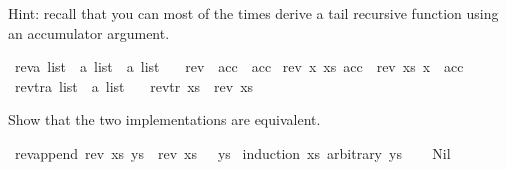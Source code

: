 \begin{isabellebody}
\begin{isamarkuptext}
  Hint: recall that you can most of the times derive a tail recursive function using an accumulator
        argument.%
\end{isamarkuptext}\isamarkuptrue%
\isamarkupfalse%
\ rev{\isacharprime}{\kern0pt}{\isacharcolon}{\kern0pt}{\isacharcolon}{\kern0pt}{\isachardoublequoteopen}{\isacharprime}{\kern0pt}a\ list\ {\isasymRightarrow}\ {\isacharprime}{\kern0pt}a\ list\ {\isasymRightarrow}\ {\isacharprime}{\kern0pt}a\ list{\isachardoublequoteclose}\ \isanewline
\ \ {\isachardoublequoteopen}rev{\isacharprime}{\kern0pt}\ {\isacharbrackleft}{\kern0pt}{\isacharbrackright}{\kern0pt}\ acc\ {\isacharequal}{\kern0pt}\ acc{\isachardoublequoteclose}\isanewline
{\isacharbar}{\kern0pt}\ {\isachardoublequoteopen}rev{\isacharprime}{\kern0pt}\ {\isacharparenleft}{\kern0pt}x\ {\isacharhash}{\kern0pt}xs{\isacharparenright}{\kern0pt}\ acc\ {\isacharequal}{\kern0pt}\ rev{\isacharprime}{\kern0pt}\ xs\ {\isacharparenleft}{\kern0pt}x\ {\isacharhash}{\kern0pt}\ acc{\isacharparenright}{\kern0pt}{\isachardoublequoteclose}\isanewline
\isanewline
\isanewline
\isanewline
\isanewline
{}\isamarkupfalse%
\ rev{\isacharunderscore}{\kern0pt}tr{\isacharcolon}{\kern0pt}{\isacharcolon}{\kern0pt}{\isachardoublequoteopen}{\isacharprime}{\kern0pt}a\ list\ {\isasymRightarrow}\ {\isacharprime}{\kern0pt}a\ list{\isachardoublequoteclose}\ \isanewline
\isanewline
\ \ {\isachardoublequoteopen}rev{\isacharunderscore}{\kern0pt}tr\ xs\ {\isacharequal}{\kern0pt}\ rev{\isacharprime}{\kern0pt}\ xs\ {\isacharbrackleft}{\kern0pt}{\isacharbrackright}{\kern0pt}{\isachardoublequoteclose}%
\begin{isamarkuptext}%
Show that the two implementations are equivalent.%
\end{isamarkuptext}\isamarkuptrue%
\isamarkupfalse%
\ rev{\isacharprime}{\kern0pt}{\isacharunderscore}{\kern0pt}append{\isacharcolon}{\kern0pt}\ {\isachardoublequoteopen}rev{\isacharprime}{\kern0pt}\ xs\ ys\ {\isacharequal}{\kern0pt}\ {\isacharparenleft}{\kern0pt}rev{\isacharprime}{\kern0pt}\ xs\ {\isacharbrackleft}{\kern0pt}{\isacharbrackright}{\kern0pt}{\isacharparenright}{\kern0pt}\ {\isacharat}{\kern0pt}\ ys{\isachardoublequoteclose}\isanewline
%
\isadelimproof
%
\endisadelimproof
%
\isatagproof
{}\isamarkupfalse%
\ {\isacharparenleft}{\kern0pt}induction\ xs\ arbitrary{\isacharcolon}{\kern0pt}\ ys{\isacharparenright}{\kern0pt}\isanewline
\ \ \isamarkupfalse%
\ Nil\isanewline
\ \ \isamarkupfalse%
\ \isamarkupfalse%

\end{isabellebody}
